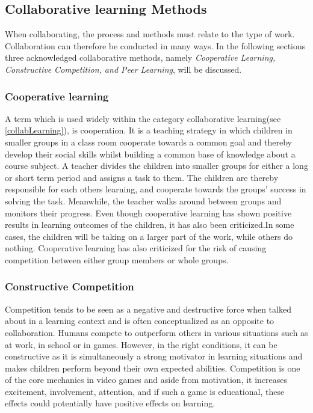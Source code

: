 \subsection{Collaborative learning Methods} 
When collaborating, the process and methods must relate to the type of work. Collaboration can therefore be conducted in many ways. In the following sections three acknowledged collaborative methods, namely \textit{Cooperative Learning, Constructive Competition, and Peer Learning}, will be discussed.  

\subsubsection{Cooperative learning}
A term which is used widely within the category collaborative learning(see \autoref{collabLearning}), is cooperation\cite{collaborationCooperation}. It is a teaching strategy in which children in smaller groups in a class room cooperate towards a common goal and thereby develop their social skills whilst building a common base of knowledge about a course subject\cite{collaborativeLearningTeachers}\cite[p.~15]{peerLearning}\cite{collaborationCompetition}\cite{cooperativeLearningPractice}. A teacher divides the children into smaller groups for either a long or short term period and assigns a task to them. The children are thereby responsible for each others learning, and cooperate towards the groups' success in solving the task. Meanwhile, the teacher walks around between groups and monitors their progress\cite{cooperativeLearningPractice}. Even though cooperative learning has shown positive results in learning outcomes of the children, it has also been criticized.In some cases, the children will be taking on a larger part of the work, while others do nothing. Cooperative learning has also criticized for the risk of causing competition between either group members or whole groups\cite{collaborationCooperation}.

\subsubsection{Constructive Competition}
Competition tends to be seen as a negative and destructive force when talked about in a learning context and is often conceptualized as an opposite to collaboration\cite{collaborationCompetition}. Humans compete to outperform others in various situations such as at work, in school or in games\cite{collaborationCompetitionGames}\cite{collaborationCompetition}. However, in the right conditions, it can be constructive as it is simultaneously a strong motivator in learning situations\cite{collaborationCompetitionGames} and makes children perform beyond their own expected abilities\cite{collaborationCompetition}. Competition is one of the core mechanics in video games and aside from  motivation, it increases excitement, involvement, attention, and if such a game is educational, these effects could potentially have positive effects on learning\cite{collaborationCompetitionGames}. 

